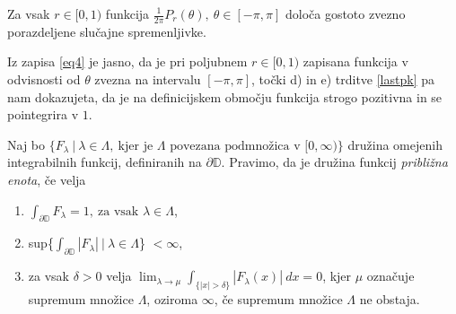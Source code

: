 \documentclass[mat1, tisk]{fmfdelo}
\begin{document}
    \begin{posledica}
        Za vsak $r \in [0, 1)$ funkcija $\frac{1}{2 \pi} P_r(\theta),~ \theta \in [-\pi, \pi]$ določa gostoto zvezno porazdeljene slučajne spremenljivke.
    \end{posledica}
    \begin{dokaz}
        Iz zapisa \eqref{eq4} je jasno, da je pri poljubnem $r \in [0,1)$ zapisana funkcija v odvisnosti od $\theta$ zvezna na intervalu $[-\pi, \pi]$, točki d) in e) trditve \ref{lastpk} pa nam dokazujeta, da je na definicijskem območju funkcija strogo pozitivna in se pointegrira v $1$.
    \end{dokaz}

    \begin{definicija}
        Naj bo $\{F_{\lambda}~|~\lambda \in \Lambda,~\text{kjer je $\Lambda$ povezana podmnožica v $[0, \infty)$}\}$ družina omejenih integrabilnih funkcij, definiranih na $\partial \mathbb{D}$. Pravimo, da je družina funkcij \emph{približna enota}, če velja
        \begin{enumerate}[label={\Alph*)}]
            \item $\int_{\partial \mathbb{D}}{F_\lambda} = 1,~\text{za vsak $\lambda \in \Lambda$}$,
            \item sup\{$\int_{\partial \mathbb{D}}{\left| F_{\lambda}\right|}~|~\lambda \in \Lambda$\} $< \infty$,
            \item za vsak $\delta > 0$ velja $\lim_{\lambda \to \mu}{\int_{\{|x| > \delta\}}{|F_{\lambda}(x)|~dx}} = 0$, kjer $\mu$ označuje supremum množice $\Lambda$, oziroma $\infty$, če supremum množice $\Lambda$ ne obstaja.
        \end{enumerate}
    \end{definicija}
\end{document}
